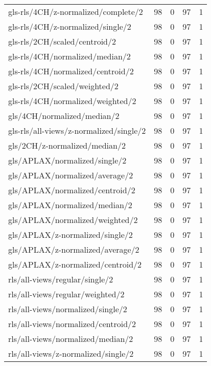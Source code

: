 \begin{longtable}{lrrrr}
    gls-rls/4CH/z-normalized/complete/2       & 98 &  0 & 97 &  1 \\
    gls-rls/4CH/z-normalized/single/2         & 98 &  0 & 97 &  1 \\
    gls-rls/2CH/scaled/centroid/2             & 98 &  0 & 97 &  1 \\
    gls-rls/4CH/normalized/median/2           & 98 &  0 & 97 &  1 \\
    gls-rls/4CH/normalized/centroid/2         & 98 &  0 & 97 &  1 \\
    gls-rls/2CH/scaled/weighted/2             & 98 &  0 & 97 &  1 \\
    gls-rls/4CH/normalized/weighted/2         & 98 &  0 & 97 &  1 \\
    gls/4CH/normalized/median/2               & 98 &  0 & 97 &  1 \\
    gls-rls/all-views/z-normalized/single/2   & 98 &  0 & 97 &  1 \\
    gls/2CH/z-normalized/median/2             & 98 &  0 & 97 &  1 \\
    gls/APLAX/normalized/single/2             & 98 &  0 & 97 &  1 \\
    gls/APLAX/normalized/average/2            & 98 &  0 & 97 &  1 \\
    gls/APLAX/normalized/centroid/2           & 98 &  0 & 97 &  1 \\
    gls/APLAX/normalized/median/2             & 98 &  0 & 97 &  1 \\
    gls/APLAX/normalized/weighted/2           & 98 &  0 & 97 &  1 \\
    gls/APLAX/z-normalized/single/2           & 98 &  0 & 97 &  1 \\
    gls/APLAX/z-normalized/average/2          & 98 &  0 & 97 &  1 \\
    gls/APLAX/z-normalized/centroid/2         & 98 &  0 & 97 &  1 \\
    rls/all-views/regular/single/2            & 98 &  0 & 97 &  1 \\
    rls/all-views/regular/weighted/2          & 98 &  0 & 97 &  1 \\
    rls/all-views/normalized/single/2         & 98 &  0 & 97 &  1 \\
    rls/all-views/normalized/centroid/2       & 98 &  0 & 97 &  1 \\
    rls/all-views/normalized/median/2         & 98 &  0 & 97 &  1 \\
    rls/all-views/z-normalized/single/2       & 98 &  0 & 97 &  1 \\

\end{longtable}
